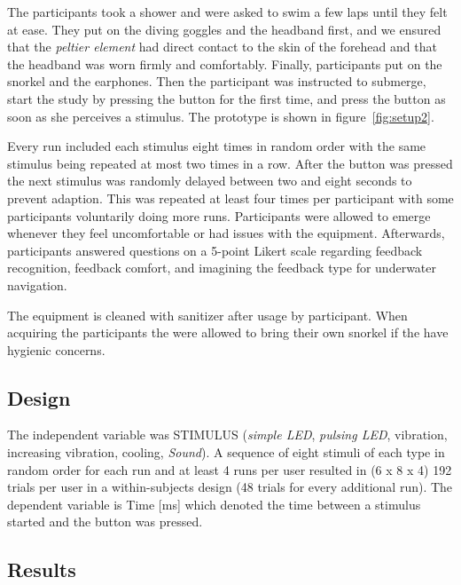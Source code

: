 The participants took a shower and were asked to swim a few laps until they felt at ease. 
They put on the diving goggles and the headband first, and we ensured that the \emph{peltier element} had direct contact to the skin  of the forehead and that the headband was worn firmly and comfortably. 
Finally, participants put on the snorkel and the earphones. 
Then the participant was instructed to submerge, start the study by pressing the button for the first time, and press the button as soon as she perceives a stimulus.
The prototype is shown in figure~\ref{fig:setup2}. 

Every run included each stimulus eight times in random order with the same stimulus being repeated at most two times in a row. After the button was pressed the next stimulus was randomly delayed between two and eight seconds to prevent adaption. 
This was repeated at least four times per participant with some participants voluntarily doing more runs. 
Participants were allowed to emerge whenever they feel uncomfortable or had issues with the equipment. 
Afterwards, participants answered questions on a 5-point Likert scale regarding feedback recognition, feedback comfort, and imagining the feedback type for underwater navigation.

The equipment is cleaned with sanitizer after usage by participant. 
When acquiring the participants the were allowed to bring their own snorkel if the have hygienic concerns. 

\subsection{Design}
The independent variable was STIMULUS (\emph{simple LED}, \emph{pulsing LED}, vibration, increasing vibration, cooling, \emph{Sound}). 
A sequence of eight stimuli of each type in random order for each run and at least 4 runs per user resulted in (6 x 8 x 4) 192 trials per user in a within-subjects design (48 trials for every additional run). 
The dependent variable is Time [ms] which denoted the time between a stimulus started and the button was pressed.

\subsection{Results}

